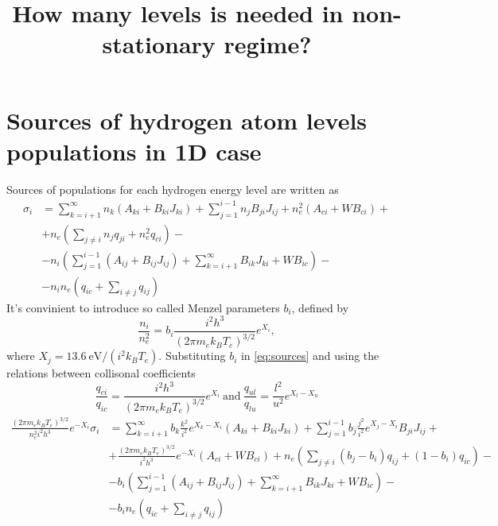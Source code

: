 \documentclass{article}
\title{How many levels is needed in non-stationary regime?}
\begin{document}
\maketitle
    
\section{Sources of hydrogen atom levels populations in 1D case}

Sources of populations for each hydrogen energy level are written as
\begin{equation}\label{eq:sources}
    \begin{aligned}
        \sigma_i &= \sum\limits_{k=i+1}^\infty n_k(A_{ki} + B_{ki}J_{ki}) + \sum\limits_{j=1}^{i-1} n_jB_{ji}J_{ij}+ n_e^2(A_{ci} + WB_{ci})+\\
        &+n_e\left(\sum\limits_{j\neq i}n_jq_{ji}  + n_e^2q_{ci}\right)-\\
        &-n_i\left(\sum\limits_{j=1}^{i-1}(A_{ij} + B_{ij}J_{ij}) + \sum\limits_{k=i+1}^\infty B_{ik}J_{ki} + WB_{ic}\right) -\\
        &-n_in_e\left(q_{ic} + \sum\limits_{i \neq j}q_{ij}\right)
    \end{aligned}
\end{equation}
It's convinient to introduce so called Menzel parameters \(b_i\), defined by
\begin{equation}\label{eq:menzel}
    \frac{n_i}{n_e^2} = b_i\frac{i^2h^3}{(2\pi m_ek_BT_e)^{3/2}}e^{X_i},
\end{equation}
where \(X_j = 13.6\ \mathrm{eV}/(i^2k_BT_e)\). Substituting \(b_i\) in \eqref{eq:sources} and using the relations between collisonal coefficients
\[
\frac{q_{ci}}{q_{ic}} = \frac{i^2h^3}{(2\pi m_ek_BT_e)^{3/2}}e^{X_i}\ \mathrm{and}\  \frac{q_{ul}}{q_{lu}} = \frac{l^2}{u^2}e^{X_l - X_u}
\]
\begin{equation}
    \begin{aligned}
        \frac{(2\pi m_ek_BT_e)^{3/2}}{n_e^2i^2h^3}e^{-X_i}\sigma_i &= \sum\limits_{k=i+1}^\infty b_k\frac{k^2}{i^2}e^{X_k-X_i}(A_{ki} + B_{ki}J_{ki}) + \sum\limits_{j=1}^{i-1} b_j\frac{j^2}{i^2}e^{X_j-X_i}B_{ji}J_{ij} +\\
        &+\frac{(2\pi m_ek_BT_e)^{3/2}}{i^2h^3}e^{-X_i}(A_{ci} + WB_{ci}) +n_e\left(\sum\limits_{j \neq i}(b_j-b_i)q_{ij}  + (1-b_i)q_{ic}\right)-\\
        &-b_i\left(\sum\limits_{j=1}^{i-1}(A_{ij} + B_{ij}J_{ij}) + \sum\limits_{k=i+1}^\infty B_{ik}J_{ki} + WB_{ic}\right) -\\
        &-b_in_e\left(q_{ic} + \sum\limits_{i \neq j}q_{ij}\right)
    \end{aligned}
\end{equation}
\end{document}
